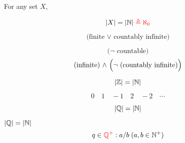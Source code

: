 \begin{frame}{}
  \begin{definition}[Infinite]
    For any set $X$,
    \begin{description}
      \item[Countably Infinite]
	\[
	  |X| = |\mathbb{N}| \textcolor{red}{\;\triangleq \aleph_{0}}
	\]
      \item[Countable]
	\[
	  \text{(finite $\lor$ countably infinite)}
	\]
      \item[Uncountable]
	\[
	  \text{($\lnot$ countable)}
	\]
	\[
	  \text{(infinite) $\land$ \Big($\lnot$ (countably infinite)\Big)}
	\]
    \end{description}
  \end{definition}
\end{frame}

\begin{frame}{}
\end{frame}

\begin{frame}{}
  \begin{theorem}[$\Z$ is Countable.]
    \[
      |\mathbb{Z}| = |\mathbb{N}|
    \]
  \end{theorem}


  \pause
  \[
    0 \quad 1 \quad -1 \quad 2 \quad -2 \quad \cdots
  \]
\end{frame}

\begin{frame}{}
  \begin{theorem}
    \[
      |\mathbb{Q}| = |\mathbb{N}|
    \]
  \end{theorem}

  \pause
  \begin{exampleblock}{$|\mathbb{Q}| = |\mathbb{N}|$}
    \[
      q \in \textcolor{red}{\mathbb{Q}^{+}}: a / b \; (a,b \in \mathbb{N}^{+})
    \]

    \pause
    \vspace{-0.30cm}
    \begin{columns}
    \end{columns}
  \end{exampleblock}
\end{frame}

